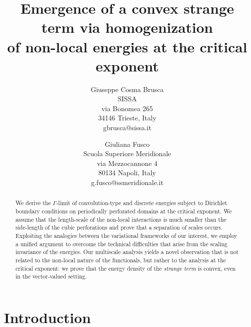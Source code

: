 \documentclass{article}
\theoremstyle{plain}
\theoremstyle{definition}
\numberwithin{equation}{section}
\begin{document}
\title{Emergence of a convex strange term via homogenization \\ of non-local energies at the critical exponent}

\author{ Giuseppe Cosma Brusca \\
{\small SISSA}\\ \small
via Bonomea 265\\ \small
34146 Trieste, Italy\\ \small gbrusca@sissa.it
\and
Giuliana Fusco\\ 
{\small Scuola Superiore Meridionale}\\ {\small via Mezzocannone 4}\\\small 80134 Napoli, Italy \\ \small  g.fusco@ssmeridionale.it
}
\date{}

\maketitle
{
  \renewcommand{\thefootnote}{}%
}


\begin{abstract}
   We derive the $\Gamma$-limit of convolution-type and discrete energies subject to Dirichlet boundary conditions on periodically perforated domains at the critical exponent. We assume that the length-scale of the non-local interactions is much smaller than the side-length of the cubic perforations and prove that a separation of scales occurs. Exploiting the analogies between the variational frameworks of our interest, we employ a unified argument to overcome the technical difficulties that arise from the scaling invariance of the energies. Our multiscale analysis yields a novel observation that is not related to the non-local nature of the functionals, but rather to the analysis at the critical exponent: we prove that the energy density of the \textit{strange term} is convex, even in the vector-valued setting.
\end{abstract}


\section{Introduction}
\end{document}
